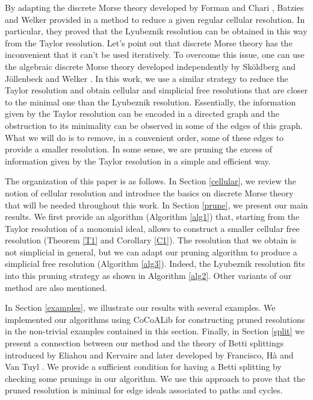 \documentclass[12pt]{amsart}
\theoremstyle{definition}
\theoremstyle{remark}
\numberwithin{equation}{section}
\begin{document}
By adapting the discrete Morse theory developed by Forman \cite{For} and
Chari \cite{CH},  Batzies and Welker provided in \cite{BW} a method to reduce
a given regular cellular resolution. In particular, they proved that the Lyubeznik
resolution can be obtained in this way from the Taylor resolution.
Let's point out that discrete Morse theory has the inconvenient that it can't be used
iteratively. To overcome this issue, one can use the algebraic discrete Morse theory developed independently by
 Sk\"oldberg \cite{Sko} and J\"ollenbeck and Welker \cite{JW}.
In this work, we use a similar strategy to reduce the Taylor
resolution and obtain cellular and simplicial free resolutions that
are closer to the minimal one than the Lyubeznik
resolution. Essentially, the information given by the Taylor
resolution can be encoded in a directed graph and the obstruction to
its minimality can be observed in some of the edges of this graph.
What we will do is to remove, in a convenient order, some of these
edges to provide a smaller resolution. In some sense, we are pruning
the excess of information given by the Taylor resolution in a simple and efficient way.

\vskip 2mm

The organization of this paper is as follows. In Section \ref{cellular},
we review the notion of  cellular resolution and introduce the basics
on discrete Morse theory that will be needed throughout this work.
In Section \ref{prune}, we present our main results. We first provide an algorithm
(Algorithm \ref{alg1}) that, starting from the Taylor resolution of a monomial ideal,
allows to construct a smaller cellular free resolution
(Theorem \ref{T1} and  Corollary \ref{C1}).
The resolution that we obtain is not simplicial in general, but
we can adapt our pruning algorithm to produce a simplicial free resolution (Algorithm \ref{alg3}).
Indeed, the Lyubeznik resolution fits into this pruning strategy as shown in Algorithm \ref{alg2}.
Other variants of our method are also mentioned.

\vskip 2mm

In Section \ref{examples}, we illustrate our results with several examples.
We implemented our algorithms using CoCoALib \cite{cocoa}
for constructing pruned resolutions in the non-trivial examples contained in this section.
Finally, in Section \ref{split} we present a connection between our method and the
theory of Betti splittings introduced by Eliahou and Kervaire \cite{EK} and
later developed by Francisco, H\`a and Van Tuyl \cite{FHV}. We provide a sufficient condition
for having a Betti splitting by checking some prunings in our algorithm. We use this
approach to prove that the pruned resolution is minimal for edge ideals associated to paths and cycles.
\end{document}
